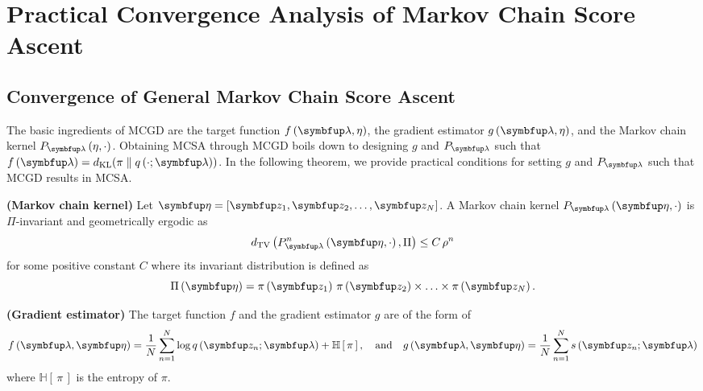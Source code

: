 
\section{Practical Convergence Analysis of Markov Chain Score Ascent}
\subsection{Convergence of General Markov Chain Score Ascent}\label{section:convergence}

The basic ingredients of MCGD are the target function \(f\left(\vlambda, \eta\right)\), the gradient estimator \(g\left(\vlambda, \eta\right)\), and the Markov chain kernel \(P_{\vlambda}\left(\eta, \cdot\right)\).
Obtaining MCSA through MCGD boils down to designing \(g\) and \(P_{\vlambda}\) such that \(f\left(\vlambda\right) = \DKL{\pi}{q\left(\cdot; \vlambda\right)} \).
In the following theorem, we provide practical conditions for setting \(g\) and \(P_{\vlambda}\) such that MCGD results in MCSA.

\begin{condition}{\textbf{(Markov chain kernel)}}\label{thm:kernel_conditions}
  Let \(\veta = \left[ \vz_1, \vz_2, \ldots, \vz_N \right]\).
  A Markov chain kernel \(P_{\vlambda}\left(\veta, \cdot\right)\) is \(\Pi\)-invariant and geometrically ergodic as
  \[
  \DTV{P_{\vlambda}^{n}\left(\veta, \cdot\right)}{ \Pi } \leq C \, \rho^{n}
  \]
  for some positive constant \(C\) where its invariant distribution is defined as
  \[
  \Pi\left(\veta\right) = \pi\left(\vz_1\right) \, \pi\left(\vz_2\right) \times \ldots \times \pi\left(\vz_N\right).
  \]
\end{condition}

\begin{condition}{\textbf{(Gradient estimator)}}\label{thm:gradient_estimator}
  The target function \(f\) and the gradient estimator \(g\) are of the form of
  \begin{align*}
    f\left(\vlambda, \veta\right) =  \frac{1}{N} \sum^{N}_{n=1} \log q\left(\vz_n; \vlambda\right) + \mathbb{H}\left[\,\pi\,\right], 
    \quad\text{and}\quad
    g\left(\vlambda, \veta\right) =  \frac{1}{N} \sum^{N}_{n=1} s\left(\vz_n; \vlambda\right)
  \end{align*}
  where \(\mathbb{H}\left[\,\pi\,\right]\) is the entropy of \(\pi\).
\end{condition}



